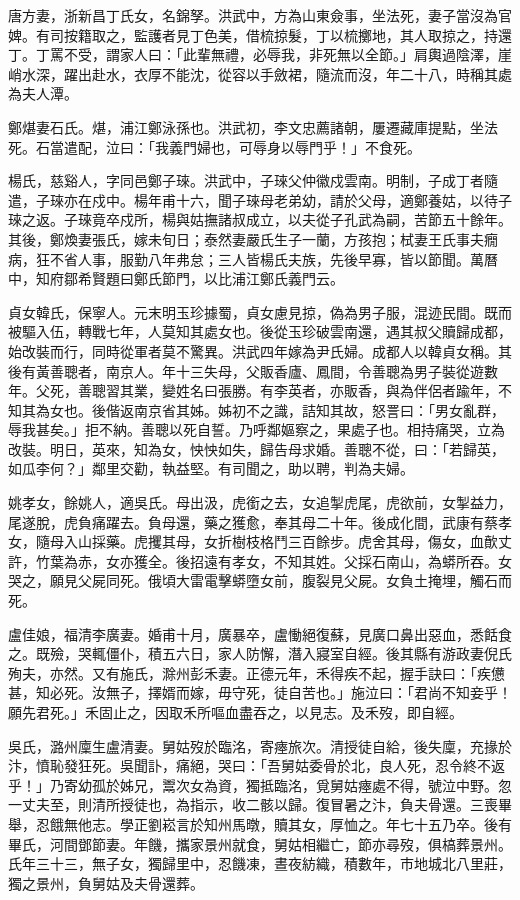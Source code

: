 \begin{pinyinscope}
唐方妻，浙新昌丁氏女，名錦孥。洪武中，方為山東僉事，坐法死，妻子當沒為官婢。有司按籍取之，監護者見丁色美，借梳掠髮，丁以梳擲地，其人取掠之，持還丁。丁罵不受，謂家人曰：「此輩無禮，必辱我，非死無以全節。」肩輿過陰澤，崖峭水深，躍出赴水，衣厚不能沈，從容以手斂裙，隨流而沒，年二十八，時稱其處為夫人潭。

鄭煁妻石氏。煁，浦江鄭泳孫也。洪武初，李文忠薦諸朝，屢遷藏庫提點，坐法死。石當遣配，泣曰：「我義門婦也，可辱身以辱門乎！」不食死。

楊氏，慈谿人，字同邑鄭子琜。洪武中，子琜父仲徽戍雲南。明制，子成丁者隨遣，子琜亦在戍中。楊年甫十六，聞子琜母老弟幼，請於父母，適鄭養姑，以待子琜之返。子琜竟卒戍所，楊與姑撫諸叔成立，以夫從子孔武為嗣，苦節五十餘年。其後，鄭煥妻張氏，嫁未旬日；泰然妻嚴氏生子一蘭，方孩抱；栻妻王氏事夫癇病，狂不省人事，服勤八年弗怠；三人皆楊氏夫族，先後早寡，皆以節聞。萬曆中，知府鄒希賢題曰鄭氏節門，以比浦江鄭氏義門云。

貞女韓氏，保寧人。元末明玉珍據蜀，貞女慮見掠，偽為男子服，混迹民間。既而被驅入伍，轉戰七年，人莫知其處女也。後從玉珍破雲南還，遇其叔父贖歸成都，始改裝而行，同時從軍者莫不驚異。洪武四年嫁為尹氏婦。成都人以韓貞女稱。其後有黃善聰者，南京人。年十三失母，父販香廬、鳳間，令善聰為男子裝從遊數年。父死，善聰習其業，變姓名曰張勝。有李英者，亦販香，與為伴侶者踰年，不知其為女也。後偕返南京省其姊。姊初不之識，詰知其故，怒詈曰：「男女亂群，辱我甚矣。」拒不納。善聰以死自誓。乃呼鄰嫗察之，果處子也。相持痛哭，立為改裝。明日，英來，知為女，怏怏如失，歸告母求婚。善聰不從，曰：「若歸英，如瓜李何？」鄰里交勸，執益堅。有司聞之，助以聘，判為夫婦。

姚孝女，餘姚人，適吳氏。母出汲，虎銜之去，女追掣虎尾，虎欲前，女掣益力，尾遂脫，虎負痛躍去。負母還，藥之獲愈，奉其母二十年。後成化間，武康有蔡孝女，隨母入山採藥。虎攫其母，女折樹枝格鬥三百餘步。虎舍其母，傷女，血歕丈許，竹葉為赤，女亦獲全。後招遠有孝女，不知其姓。父採石南山，為蟒所吞。女哭之，願見父屍同死。俄頃大雷電擊蟒墮女前，腹裂見父屍。女負土掩埋，觸石而死。

盧佳娘，福清李廣妻。婚甫十月，廣暴卒，盧慟絕復蘇，見廣口鼻出惡血，悉餂食之。既殮，哭輒僵仆，積五六日，家人防懈，潛入寢室自經。後其縣有游政妻倪氏殉夫，亦然。又有施氏，滁州彭禾妻。正德元年，禾得疾不起，握手訣曰：「疾憊甚，知必死。汝無子，擇婿而嫁，毋守死，徒自苦也。」施泣曰：「君尚不知妾乎！願先君死。」禾固止之，因取禾所嘔血盡吞之，以見志。及禾歿，即自經。

吳氏，潞州廩生盧清妻。舅姑歿於臨洺，寄瘞旅次。清授徒自給，後失廩，充掾於汴，憤恥發狂死。吳聞訃，痛絕，哭曰：「吾舅姑委骨於北，良人死，忍令終不返乎！」乃寄幼孤於姊兄，鬻次女為資，獨抵臨洺，覓舅姑瘞處不得，號泣中野。忽一丈夫至，則清所授徒也，為指示，收二骸以歸。復冒暑之汴，負夫骨還。三喪畢舉，忍餓無他志。學正劉崧言於知州馬暾，贖其女，厚恤之。年七十五乃卒。後有畢氏，河間鄧節妻。年饑，攜家景州就食，舅姑相繼亡，節亦尋歿，俱槁葬景州。氏年三十三，無子女，獨歸里中，忍饑凍，晝夜紡織，積數年，市地城北八里莊，獨之景州，負舅姑及夫骨還葬。


\end{pinyinscope}
